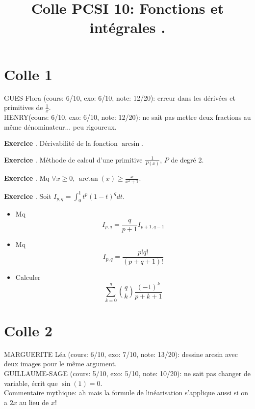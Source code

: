 \documentclass[10pt,a4paper]{article}
\title{Colle PCSI 10: Fonctions et intégrales	.}
\newcounter{question}
\newcounter{exo}
\newenvironment{exo}{\vspace{0.5cm}\setcounter{question}{0}\addtocounter{exo}{1} \noindent \textbf{Exercice \theexo}. \normalsize }{\par}
\begin{document}
	\maketitle
	
	
	\section*{Colle 1}
	\setcounter{exo}{0}
	GUES Flora (cours: 6/10, exo: 6/10, note: 12/20): erreur dans les dérivées et primitives de $\frac{1}{x}$.\\
	HENRY(cours: 6/10, exo: 6/10, note: 12/20): ne sait pas mettre deux fractions au même dénominateur... peu rigoureux.
	
	\begin{exo}
		Dérivabilité de la fonction $\arcsin$. 
	\end{exo}
	
	\begin{exo}
		Méthode de calcul d'une primitive $\frac{1}{P(x)}$, $P$ de degré 2.
	\end{exo}

	\begin{exo}
		Mq $\forall x \geq 0$, $ \arctan(x) \geq \frac{x}{x^2 + 1}$.
	\end{exo}

	\begin{exo}
		Soit $I_{p, q} = \int_{0}^{1} t^p (1 - t)^q dt$. 
		\begin{itemize}
			\item Mq $$I_{p, q} = \frac{q}{p+1} I_{p+1, q-1}$$
			\item Mq $$I_{p, q} = \frac{p! q!}{(p+q+1)!}$$
			\item Calculer $$\sum_{k=0}^{q} \binom{q}{k} \frac{(-1)^k}{p+k+1}$$
		\end{itemize}
	\end{exo}
	
	\section*{Colle 2}
	\setcounter{exo}{0}
	MARGUERITE Léa (cours: 6/10, exo: 7/10, note: 13/20): dessine arcsin avec deux images pour le même argument.\\
	GUILLAUME-SAGE (cours: 5/10, exo: 5/10, note: 10/20): ne sait pas changer de variable, écrit que $\sin(1) = 0$.\\
	Commentaire mythique: ah mais la formule de linéarisation s'applique aussi si on a $2x$ au lieu de $x$!\\
	
\end{document}
